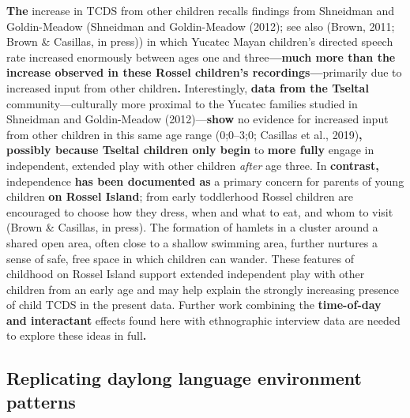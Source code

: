 \documentclass[,man,floatsintext]{apa6}
\begin{document}
\textbf{The} increase in TCDS from other children recalls findings from
Shneidman and Goldin-Meadow (Shneidman and Goldin-Meadow (2012); see
also (Brown, 2011; Brown \& Casillas, in press)) in which Yucatec Mayan
children's directed speech rate increased enormously between ages one
and three\textbf{---much more than the increase observed in these Rossel
children's recordings---}primarily due to increased input from other
children\textbf{.} Interestingly, \textbf{data from the Tseltal}
community---culturally more proximal to the Yucatec families studied in
Shneidman and Goldin-Meadow (2012)---\textbf{show} no evidence for
increased input from other children in this same age range (0;0--3;0;
Casillas et al., 2019)\textbf{, possibly because Tseltal children only
begin} to \textbf{more fully} engage in independent, extended play with
other children \emph{after} age three. In \textbf{contrast,}
independence \textbf{has been documented as} a primary concern for
parents of young children \textbf{on Rossel Island}; from early
toddlerhood Rossel children are encouraged to choose how they dress,
when and what to eat, and whom to visit (Brown \& Casillas, in press).
The formation of hamlets in a cluster around a shared open area, often
close to a shallow swimming area, further nurtures a sense of safe, free
space in which children can wander. These features of childhood on
Rossel Island support extended independent play with other children from
an early age and may help explain the strongly increasing presence of
child TCDS in the present data. Further work combining the
\textbf{time-of-day and interactant} effects found here with
ethnographic interview data are needed to explore these ideas in
full\textbf{.}

\subsection{\texorpdfstring{\textbf{Replicating daylong language
environment
patterns}}{Replicating daylong language environment patterns}}\label{replicating-daylong-language-environment-patterns}
\end{document}
